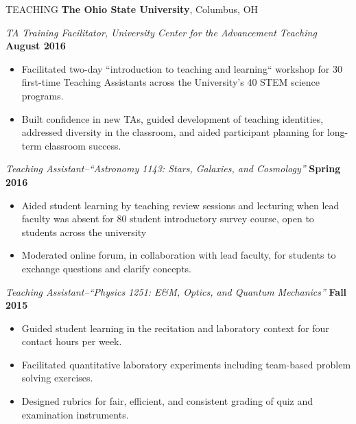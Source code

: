\documentclass{resume} %
\begin{document}
\begin{rSection}{TEACHING}
{\bf The Ohio State University}, Columbus, OH 

{\em TA Training Facilitator, University Center for the Advancement Teaching} \hfill {\bf August 2016}
\begin{itemize}
\vspace*{-.05in}
\item Facilitated two-day ``introduction to teaching and learning`` workshop for 30 first-time Teaching Assistants across the University's 40 STEM science programs.
\item Built confidence in new TAs, guided development of teaching identities, addressed diversity in the classroom, and aided participant planning for long-term classroom success.
\end{itemize}
{\em Teaching Assistant--``Astronomy 1143: Stars, Galaxies, and Cosmology''} \hfill {\bf Spring 2016}
\begin{itemize}
\vspace*{-.05in}
\item Aided student learning by teaching review sessions and lecturing when lead faculty was absent for 80 student introductory survey course, open to students across the university
\item Moderated online forum, in collaboration with lead faculty, for students to exchange questions and clarify concepts.
\end{itemize}
{\em Teaching Assistant--``Physics 1251: E\&M, Optics, and Quantum Mechanics''} \hfill {\bf Fall 2015}
\begin{itemize}
\vspace*{-.05in}
\item Guided student learning in the recitation and laboratory context for four contact hours per week.
\item Facilitated quantitative laboratory experiments including team-based problem solving exercises.
\item Designed rubrics for fair, efficient, and consistent grading of quiz and examination instruments.
\end{itemize}
\end{rSection}
\end{document}

